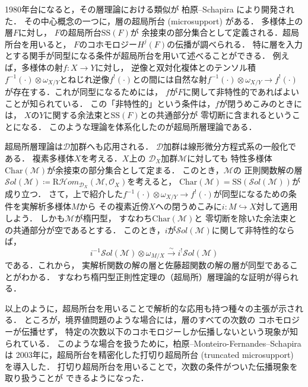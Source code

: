 ﻿\documentclass[a4paper]{jsarticle}
\theoremstyle{definition}
\numberwithin{equation}{section}
\theoremstyle{mystyle}
\begin{document}
\begin{gaiyo}
  1980年台になると，その層理論における類似が
  柏原--Schapira により開発された．
  その中心概念の一つに，層の超局所台 (microsupport) がある．
  多様体上の層\(F\)に対し，
  \(F\)の超局所台\(\mathrm{SS}(F)\)が
  余接束の部分集合として定義される．超局所台を用いると，
  \(F\)のコホモロジー\(H^{j}(F)\)の伝播が調べられる．
  特に層を入力とする関手が同型になる条件が超局所台を用いて述べることができる．
  例えば，多様体の射\(f\colon X\to Y\)に対し，
  逆像と双対化複体とのテンソル積\(
    f^{-1}(\cdot)\otimes \omega_{X/Y}
  \)とねじれ逆像\(f^{!}(\cdot)\)との間には自然な射\(
    f^{-1}(\cdot)\otimes \omega_{X/Y}
    \to f^{!}(\cdot)
  \)が存在する．これが同型になるためには，
  \(f\)が\(F\)に関して非特性的であればよいことが知られている．
  この「非特性的」という条件は，\(f\)が閉うめこみのときには，
  \(X\)の\(Y\)に関する余法束と\(\mathrm{SS}(F)\)との共通部分が
  零切断に含まれるということになる．
  このような理論を体系化したのが超局所層理論である．

  超局所層理論は\(\mathcal{D}\)加群へも応用される．
  \(\mathcal{D}\)加群は線形微分方程式系の一般化である．
  複素多様体\(X\)を考える．\(X\)上の
  \(\mathcal{D}_{X}\)加群\(\mathcal{M}\)に対しても
  特性多様体\(\mathrm{Char}(\mathcal{M})\)が余接束の部分集合として定まる．
  このとき，\(\mathcal{M}\)の
  正則関数解の層\(
    \mathcal{S}ol(\mathcal{M})\coloneqq 
    \mathrm{R}\mathcal{H}om_{\mathcal{D}_{X}}(\mathcal{M},\mathcal{O}_{X})
  \)を考えると，
  \(\mathrm{Char}(\mathcal{M})=\mathrm{SS}(\mathcal{S}ol(\mathcal{M}))\)が成り立つ．
  さて，上で紹介した\(
    f^{-1}(\cdot)\otimes \omega_{X/Y}
    \to f^{!}(\cdot)
  \)が同型になるための条件を実解析多様体\(M\)から
  その複素近傍\(X\)への閉うめこみに\(i\colon M\hookrightarrow X\)対して適用しよう．
  しかも\(\mathcal{M}\)が楕円型，
  すなわち\(\mathrm{Char}(\mathcal{M})\)と
  零切断を除いた余法束との共通部分が空であるとする．
  このとき，\(i\)が\(\mathcal{S}ol(\mathcal{M})\)に関して非特性的ならば，
  \[
    i^{-1}\mathcal{S}ol(\mathcal{M})\otimes \omega_{M/X}
    \overset{\sim}{\to}
    i^{!}\mathcal{S}ol(\mathcal{M})
  \]である．これから，
  実解析関数の解の層と佐藤超関数の解の層が同型であることがわかる．
  すなわち楕円型正則性定理の（超局所）層理論的な証明が得られる．

  以上のように，超局所台を用いることで解析的な応用も持つ種々の主張が示される．
  ところが，境界値問題のような場合には，層のすべての次数の
  コホモロジーが伝播せず，
  特定の次数以下のコホモロジーしか伝播しないという現象が知られている．
  このような場合を扱うために，柏原--Monteiro-Fernandes--Schapira は
  2003年に，超局所台を精密化した打切り超局所台 (truncated microsupport) を導入した．
  打切り超局所台を用いることで，次数の条件がついた伝播現象を取り扱うことが
  できるようになった．


\end{gaiyo}
\end{document}
